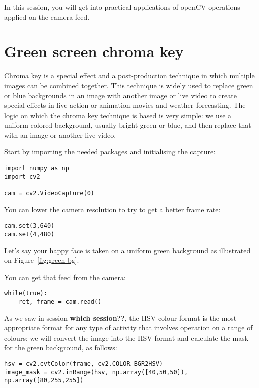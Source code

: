 \documentclass{labo}
\author{}
\begin{document}

In this session, you will get into practical applications of openCV operations applied on the camera feed.

\section*{}



\section*{Green screen chroma key}
Chroma key is a special effect and a post-production technique in which multiple images can be combined together. 
This technique is widely used to replace green or blue backgrounds in an image with another image or live video to create special effects in live action or animation movies and weather forecasting. 
The logic on which the chroma key technique is based is very simple: we use a uniform-colored background, usually bright green or blue, and then replace that with an image or another live video.

Start by importing the needed packages and initialising the capture:
\begin{verbatim}
import numpy as np
import cv2

cam = cv2.VideoCapture(0)
\end{verbatim}

You can lower the camera resolution to try to get a better frame rate:
\begin{verbatim}
cam.set(3,640)
cam.set(4,480)
\end{verbatim}

Let's say your happy face is taken on a uniform green background as illustrated on Figure~\ref{fig:green-bg}.


You can get that feed from the camera:
\begin{verbatim}
while(true):
	ret, frame = cam.read()
\end{verbatim}

As we saw in session \textbf{which session??}, the  HSV colour format is the most appropriate format for any type of activity that involves operation on a range of colours; we will convert the image into the HSV format and calculate the mask for the green background, as follows:
\begin{verbatim}
hsv = cv2.cvtColor(frame, cv2.COLOR_BGR2HSV)
image_mask = cv2.inRange(hsv, np.array([40,50,50]), np.array([80,255,255])
\end{verbatim}
\end{document}

